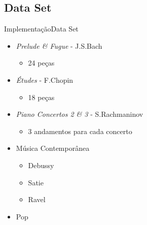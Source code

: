 \subsection{Data Set}
\begin{frame}{Implementação}{Data Set}
    \begin{itemize}
        \item \textit{Prelude \& Fugue} - J.S.Bach
        \begin{itemize}
            \item 24 peças
        \end{itemize}
        \item \textit{Études} - F.Chopin
        \begin{itemize}
            \item 18 peças
        \end{itemize}
        \item \textit{Piano Concertos 2 \& 3} - S.Rachmaninov
        \begin{itemize}
            \item 3 andamentos para cada concerto
        \end{itemize}
        \item Música Contemporânea
        \begin{itemize}
            \item Debussy
            \item Satie
            \item Ravel
        \end{itemize}
        \item Pop
    \end{itemize}
\end{frame}
